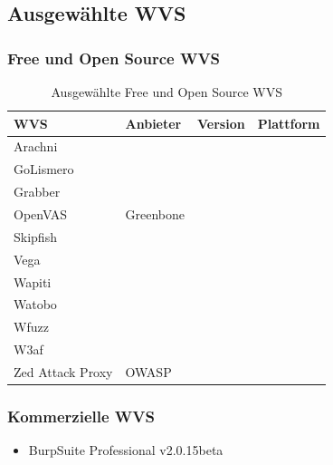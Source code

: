 \documentclass[12pt,oneside,a4paper,parskip]{scrbook}
\begin{document}
  \subsection{Ausgewählte WVS}
    \subsubsection{Free und Open Source WVS}
      \begin{table}[!htb]
        \begin{tabular}{|l|l|l|l|}
          \hline
          WVS              & Anbieter  & Version                      & Plattform \\ \hline
          Arachni          &           &                              &           \\ \hline
          GoLismero        &           &                              &           \\ \hline
          Grabber          &           &                              &           \\ \hline
          OpenVAS          & Greenbone &                              &           \\ \hline
          Skipfish         &           &                              &           \\ \hline
          Vega             &           &                              &           \\ \hline
          Wapiti           &           &                              &           \\ \hline
          Watobo           &           &                              &           \\ \hline
          Wfuzz            &           &                              &           \\ \hline
          W3af             &           &                              &           \\ \hline
          Zed Attack Proxy &  OWASP    &                              &           \\ \hline
          \end{tabular}
          \caption[Ausgewählte Free und Open Source WVS]{Ausgewählte Free und Open Source WVS}
        \end{table}

    \subsubsection{Kommerzielle WVS}
      \begin{itemize}
        \item BurpSuite Professional v2.0.15beta
      \end{itemize}
\end{document}
